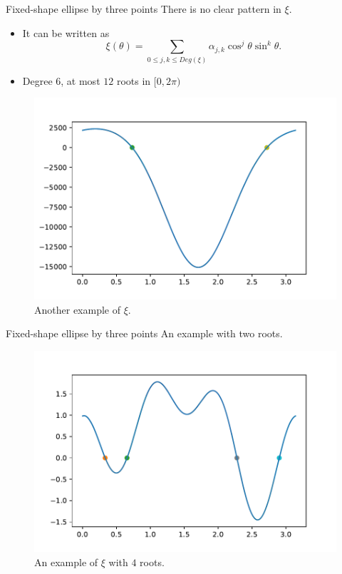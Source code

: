 \documentclass{beamer}
\begin{document}
\begin{frame}{Fixed-shape ellipse by three points}
	There is no clear pattern in $\xi$.
	\begin{itemize}
		\item It can be written as 
		$$\xi(\theta)=\sum_{0 \le j, k \le Deg(\xi)} \alpha_{j,k}\cos^{j}{\theta}\sin^{k}{\theta}.$$
		\item Degree $6$, at most $12$ roots in $[0, 2\pi)$ \cite[p.~150]{powell}
	\end{itemize}
\begin{figure}
	\centering
	
	\includegraphics[scale=.4]{012}
	\caption{Another example of $\xi$.}
\end{figure}
\end{frame}

\begin{frame}{Fixed-shape ellipse by three points}
	An example with two roots.
	\begin{figure}
		\centering
		
		\includegraphics[scale=.5]{g4sol}
		\caption{An example of $\xi$ with $4$ roots.}
	\end{figure}
\end{frame}
\end{document}
